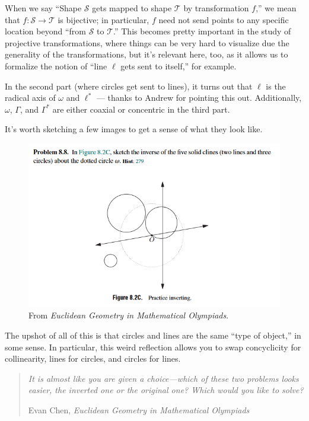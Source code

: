 \documentclass{scrartcl}
\begin{document}
\begin{remark}
	When we say ``Shape $\mathcal S$ gets mapped to shape $\mathcal T$
	by transformation $f$,'' we mean that $f\colon\mathcal S\to\mathcal T$
	is bijective; in particular, $f$ need not send points to any specific location
	beyond ``from $\mathcal S$ to $\mathcal T$.''
	This becomes pretty important in the study of projective transformations,
	where things can be very hard to visualize due the generality of
	the transformations, but it's relevant here, too, as it allows us
	to formalize the notion of ``line $\ell$ gets sent to itself,'' for example.
\end{remark}

\begin{remark}
	In the second part (where circles get sent to lines), it turns out that
	$\ell$ is the radical axis of $\omega$ and $\ell^\ast $ ---
	thanks to Andrew for pointing this out.
	Additionally, $\omega$, $\Gamma$, and $\Gamma^\ast $ are either
	coaxial or concentric in the third part.
\end{remark}

It's worth sketching a few images to get a sense of what they look like.
\begin{figure}[h]
	\centering
	\includegraphics[width=0.7\linewidth]{inversion_egmo88}
	\caption{From \emph{Euclidean Geometry in Mathematical Olympiads}.}
	\label{fig:inversionegmo88}
\end{figure}

The upshot of all of this is that circles and lines are the same ``type of object,''
in some sense. In particular, this weird reflection allows you to
swap concyclicity for collinearity, lines for circles, and circles for lines.

\begin{quote}
	\emph
	{It is almost like you are given a choice---which of these two problems
	looks easier, the inverted one or the original one?
	Which would you like to solve?}
	
	\hfill{} Evan Chen, \emph{Euclidean Geometry in Mathematical Olympiads}
\end{quote}
\end{document}
